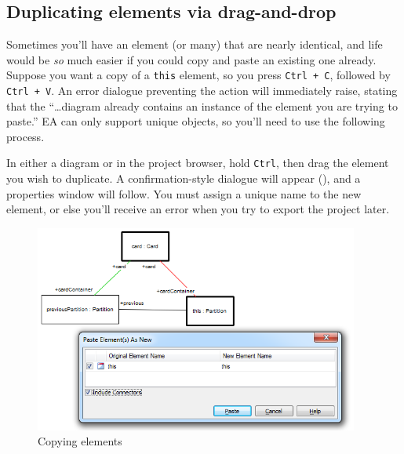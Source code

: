 \newpage

\subsection{Duplicating elements via drag-and-drop}

Sometimes you'll have an element (or many) that are nearly identical, and life would be \emph{so} much easier if you could copy and paste an existing one
already. Suppose you want a copy of a \texttt{this} element, so you press \texttt{Ctrl + C}, followed by \texttt{Ctrl + V}. An error dialogue preventing the
action will immediately raise, stating that the ``\ldots diagram already contains an instance of the element you are trying to paste.'' EA can only support
unique objects, so you'll need to use the following process.

\begin{stepbystep}

\item In either a diagram or in the project browser, hold \texttt{Ctrl}, then drag the element you wish to duplicate. A
confirmation-style dialogue will appear (), and a properties window will follow. You must assign a unique name to the new element, or
else you'll receive an error when you try to export the project later.

\vspace{0.5cm}

\begin{figure}[htbp]
\begin{center}
  \includegraphics[width=0.95\textwidth]{ea_duplicatingElements}
  \caption{Copying elements}  
  \label{ea:dupWindow}
\end{center}
\end{figure}

\end{stepbystep}
